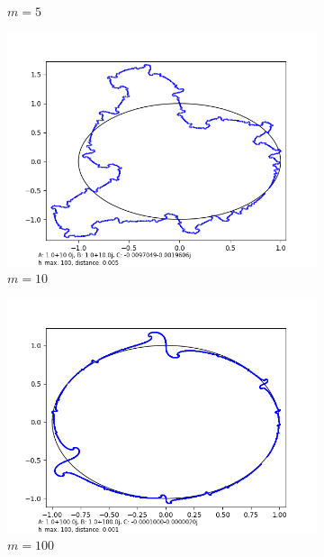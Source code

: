 \documentclass[12pt,a4paper,reqno,parskip=full]{amsart}
\numberwithin{equation}{section}
\theoremstyle{plain}
\theoremstyle{definition}
\begin{document}
\begin{figure}[H]
\begin{subfigure}[b]{0.3\textwidth}
         \caption{$m=5$}
         \label{fig:m5}
     \end{subfigure}
     \hfill 
     \begin{subfigure}[b]{0.3\textwidth}
         \centering
         \includegraphics[width=\textwidth]{images/m/a10,b10,h100,d.005.png}
         \caption{$m=10$}
         \label{fig:m10}
     \end{subfigure}
     \begin{subfigure}[b]{0.3\textwidth}
         \centering
         \includegraphics[width=\textwidth]{images/m/a100,b100,h100,d.0010.png}
         \caption{$m=100$}
         \label{fig:m100}
     \end{subfigure}
     \hfill
     \begin{subfigure}[b]{0.3\textwidth}

\end{subfigure}
\end{figure}
\end{document}
